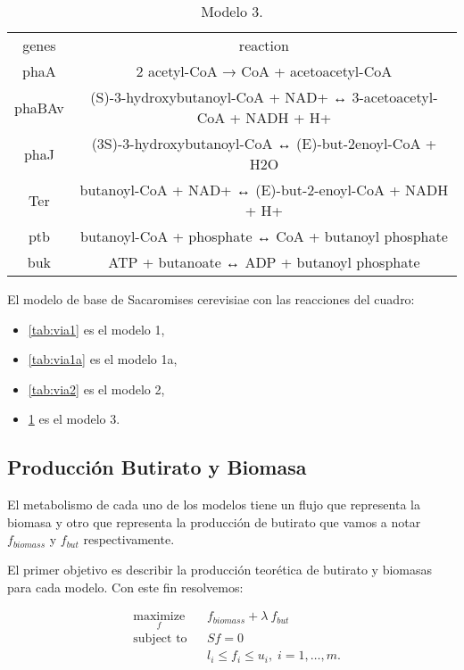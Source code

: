 \documentclass[12pt,spanish]{article}
\begin{document}
\begin{table}[ht]
\begin{tabular}{cc}
genes & reaction \\
phaA & 2 acetyl-CoA → CoA + acetoacetyl-CoA \\
phaBAv & (S)-3-hydroxybutanoyl-CoA + NAD+ ↔ 3-acetoacetyl-CoA + NADH + H+ \\
phaJ & (3S)-3-hydroxybutanoyl-CoA ↔ (E)-but-2enoyl-CoA + H2O \\
Ter & butanoyl-CoA + NAD+ ↔ (E)-but-2-enoyl-CoA + NADH + H+ \\
ptb & butanoyl-CoA + phosphate ↔  CoA + butanoyl phosphate \\
buk & ATP + butanoate ↔  ADP + butanoyl phosphate
\end{tabular}
\caption{Modelo 3.}\label{tab:via3}
\end{table}



El modelo de base de Sacaromises cerevisiae con las reacciones del cuadro:

\begin{itemize}
  \item \ref{tab:via1} es el modelo 1,
  \item \ref{tab:via1a} es el modelo 1a,
  \item \ref{tab:via2} es el modelo 2,
  \item \ref{tab:via3} es el modelo 3.
\end{itemize}

\subsection{Producción Butirato y Biomasa}

El metabolismo de cada uno de los modelos tiene un flujo que representa la biomasa y otro que representa la producción de butirato que vamos a notar $f_{biomass}$ y $f_{but}$ respectivamente.

\par
El primer objetivo es describir la producción teorética de butirato y biomasas para cada modelo. Con este fin resolvemos:


\begin{equation*}\label{eq:prob1}
\begin{aligned}
& \underset{f}{\text{maximize}}
& &  f_{biomass} +  \lambda \ f_{but} \\
& \text{subject to}
& & Sf = 0 \\
&&& l_i \leq f_i \leq u_i, \; i = 1, \ldots, m.
\end{aligned}
\end{equation*}
\end{document}
